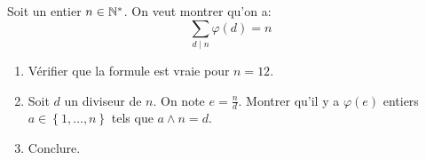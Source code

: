 \begin{td-exo} %
    Soit un entier \(n\in\mathbb{N}^\ast\). On veut montrer qu'on a:
    \begin{equation*}
        \sum_{d\mid n}\varphi(d) = n
    \end{equation*}
    \begin{enumerate}
        \item Vérifier que la formule est vraie pour \(n=12\).
        \item Soit \(d\) un diviseur de \(n\). On note \(e=\frac{n}{d}\).
        Montrer qu'il y a \(\varphi(e)\) entiers \(a\in\left\{1,\dots,n\right\}\)
        tels que \(a\wedge n=d\).
        \item Conclure.
    \end{enumerate}
\end{td-exo}
